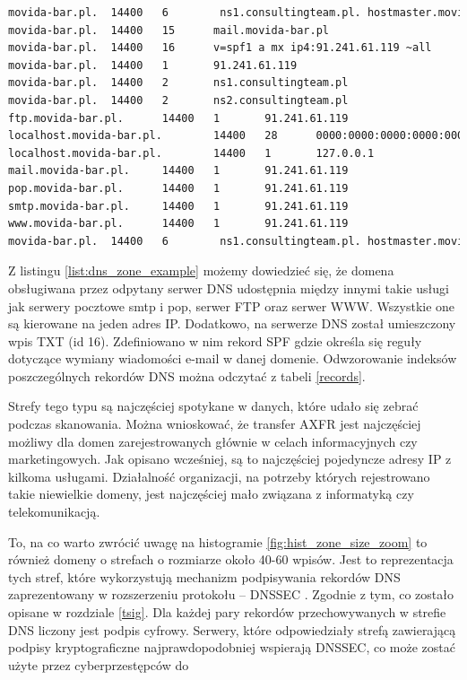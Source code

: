 \begin{lstlisting}[label={list:dns_zone_example},captionpos=b,caption=Przykładowa odpowiedź na żądanie strefy DNS.,language=bash]
movida-bar.pl.  14400   6        ns1.consultingteam.pl. hostmaster.movida-bar.pl. 1952801133 3222735464 1869837421 1634956389 1925188727
movida-bar.pl.  14400   15      mail.movida-bar.pl
movida-bar.pl.  14400   16      v=spf1 a mx ip4:91.241.61.119 ~all
movida-bar.pl.  14400   1       91.241.61.119
movida-bar.pl.  14400   2       ns1.consultingteam.pl
movida-bar.pl.  14400   2       ns2.consultingteam.pl
ftp.movida-bar.pl.      14400   1       91.241.61.119
localhost.movida-bar.pl.        14400   28      0000:0000:0000:0000:0000:0000:0000:0001
localhost.movida-bar.pl.        14400   1       127.0.0.1
mail.movida-bar.pl.     14400   1       91.241.61.119
pop.movida-bar.pl.      14400   1       91.241.61.119
smtp.movida-bar.pl.     14400   1       91.241.61.119
www.movida-bar.pl.      14400   1       91.241.61.119
movida-bar.pl.  14400   6        ns1.consultingteam.pl. hostmaster.movida-bar.pl. 2013010900 14400 3600 1209600 86400
\end{lstlisting}

Z listingu \ref{list:dns_zone_example} możemy dowiedzieć się, że domena obsługiwana przez odpytany serwer DNS udostępnia między
innymi takie usługi jak serwery pocztowe smtp i pop, serwer FTP oraz serwer WWW. Wszystkie one są kierowane na jeden adres IP.
Dodatkowo, na serwerze DNS został umieszczony wpis TXT (id 16). Zdefiniowano w nim rekord SPF gdzie określa się reguły dotyczące
wymiany wiadomości e-mail w danej domenie. Odwzorowanie indeksów poszczególnych rekordów DNS można odczytać z tabeli \ref{records}.

Strefy tego typu są najczęściej spotykane w danych, które udało się zebrać podczas skanowania. Można wnioskować, że transfer AXFR
jest najczęściej możliwy dla domen zarejestrowanych głównie w celach informacyjnych czy marketingowych. Jak opisano wcześniej, są
to najczęściej pojedyncze adresy IP z kilkoma usługami. Działalność organizacji, na potrzeby których rejestrowano takie niewielkie
domeny, jest najczęściej mało związana z informatyką czy telekomunikacją.

To, na co warto zwrócić uwagę na histogramie \ref{fig:hist_zone_size_zoom} to również domeny o strefach o rozmiarze około 40-60 wpisów.
Jest to reprezentacja tych stref, które wykorzystują mechanizm podpisywania rekordów DNS zaprezentowany w rozszerzeniu
protokołu -- DNSSEC \cite{RFC4034, RFC4035}. Zgodnie z tym, co zostało opisane w rozdziale \ref{tsig}. Dla każdej pary rekordów
przechowywanych w strefie DNS liczony jest podpis cyfrowy. Serwery, które odpowiedziały strefą zawierającą podpisy kryptograficzne
najprawdopodobniej wspierają DNSSEC, co może zostać użyte przez cyberprzestępców do

